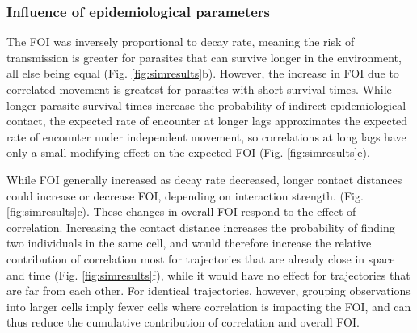 \documentclass[letterpaper]{article}
\begin{document}
\subsubsection*{Influence of epidemiological parameters}

The FOI was inversely proportional to decay rate, meaning the risk of transmission is greater for parasites that can survive longer in the environment, all else being equal (Fig. \ref{fig:simresults}b). %
However, the increase in FOI due to correlated movement is greatest for parasites with short survival times. While longer parasite survival times increase the probability of indirect epidemiological contact, the expected rate of encounter at longer lags approximates the expected rate of encounter under independent movement, so correlations at long lags have only a small modifying effect on the expected FOI (Fig. \ref{fig:simresults}e). 

While FOI generally increased as decay rate decreased, longer contact distances could increase or decrease FOI, depending on interaction strength. %
(Fig. \ref{fig:simresults}c). %
These changes in overall FOI respond to the effect of correlation. Increasing the contact distance increases the probability of finding two individuals in the same cell, and would therefore increase the relative contribution of correlation most for trajectories that are already close in space and time (Fig. \ref{fig:simresults}f), while it would have no effect for trajectories that are far from each other. For identical trajectories, however, grouping observations into larger cells imply fewer cells where correlation is impacting the FOI, and can thus reduce the cumulative contribution of correlation and overall FOI. 
\end{document}
